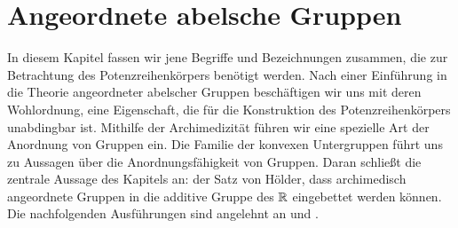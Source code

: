 \chapter{Angeordnete abelsche Gruppen}\label{chap2} %
In diesem Kapitel fassen wir jene Begriffe und Bezeichnungen zusammen, die zur Betrachtung des Potenzreihenkörpers benötigt werden. Nach einer Einführung in die Theorie angeordneter abelscher Gruppen beschäftigen wir uns mit deren Wohlordnung, eine Eigenschaft, die für die Konstruktion des Potenzreihenkörpers unabdingbar ist. Mithilfe der Archimedizität führen wir eine spezielle Art der Anordnung von Gruppen ein. Die Familie der konvexen Untergruppen führt uns zu Aussagen über die Anordnungsfähigkeit von Gruppen. Daran schließt die zentrale Aussage des Kapitels an: der Satz von Hölder, dass archimedisch angeordnete Gruppen in die additive Gruppe des $\mathbb{R}$ eingebettet werden können. \\
Die nachfolgenden Ausführungen sind angelehnt an \cite[S. 21 - 28]{fuchs66} und \cite[S. 1 -  4]{priesscrampe83}.
%
%


